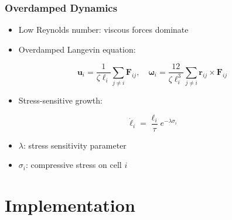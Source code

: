 \documentclass[
	10pt,
	t
]{beamer}
\begin{document}
\begin{frame}
    \frametitle{Overdamped Dynamics}

    \begin{itemize}
        \item Low Reynolds number: viscous forces dominate
        \item Overdamped Langevin equation:
    \end{itemize}

    \vspace{0.2cm}

    \begin{equation*}
        \mathbf{u}_i = \frac{1}{\zeta \ell_i} \sum_{j \neq i} \mathbf{F}_{ij}, \quad
        \boldsymbol{\omega}_i = \frac{12}{\zeta \ell_i^3} \sum_{j \neq i} \mathbf{r}_{ij} \times \mathbf{F}_{ij}
    \end{equation*}

    \begin{itemize}
        \item Stress-sensitive growth:
    \end{itemize}

    \begin{equation*}
        \dot{\ell}_i = \frac{\ell_i}{\tau} e^{-\lambda \sigma_i}
    \end{equation*}

    \begin{itemize}
        \item $\lambda$: stress sensitivity parameter
        \item $\sigma_i$: compressive stress on cell $i$
    \end{itemize}

\end{frame}

\section{Implementation}
\end{document}
